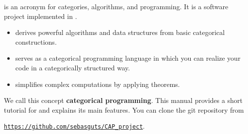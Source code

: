 \CapPkg is an acronym for categories, algorithms, and programming.
It is a software project implemented in \GAP.
\begin{itemize}
  \item \CapPkg derives powerful algorithms and data structures from basic categorical constructions.
  \item \CapPkg serves as a categorical programming language in which you can realize your
  code in a categorically structured way.
  \item \CapPkg simplifies complex computations
  by applying theorems.
 \end{itemize}
We call this concept \textbf{categorical programming}. 
This manual provides a short tutorial for \CapPkg and explains
its main features.
You can clone the \CapPkg git repository from
\begin{center}
 \href{https://github.com/sebasguts/CAP_project}{\texttt{https://github.com/sebasguts/CAP\_project}}.
\end{center}
